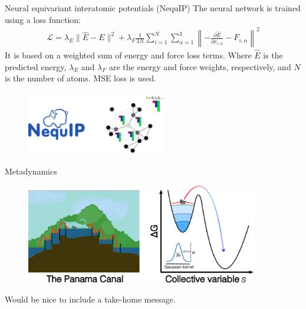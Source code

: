 \documentclass[11pt,t]{beamer}
\begin{document}
\begin{frame}{Neural equivariant interatomic potentials (NequIP)}
	\small
	The neural network is trained using a loss function:
	\begin{gather*}
		\mathcal{L} = \lambda_E \lVert \hat{E} - E \rVert^2 + \lambda_F \frac{1}{3N} \sum_{i=1}^{N} \sum_{\alpha=1}^{3} \left\lVert -\frac{\partial \hat{E}}{\partial r_{i,\alpha}} - F_{i,\alpha} \right\rVert^2
		\label{eq:loss_function}
	\end{gather*}
	It is based on a weighted sum of energy and force loss terms. Where $\hat{E}$ is the predicted energy, $\lambda_E$ and $\lambda_F$ are the energy and force weights, respectively, and $N$ is the number of atoms. MSE loss is used.
	\begin{figure}
		\centering
		\includegraphics[width=0.55\textwidth]{Figures/theory_nequip.png}
	\end{figure}
\end{frame}



\begin{frame}{Metadynamics}
	\vspace{-10pt}
	\begin{figure}
		\centering
		\includegraphics[width=0.9\textwidth]{Figures/theory_metadynamics.png}
	\end{figure}
	\small
	Would be nice to include a take-home message.
\end{frame}



\end{document}
